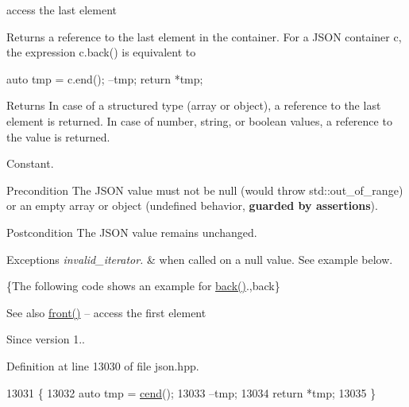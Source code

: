 access the last element 

Returns a reference to the last element in the container. For a J\+S\+ON container {\ttfamily c}, the expression {\ttfamily c.\+back()} is equivalent to 
\begin{DoxyCode}
\textcolor{keyword}{auto} tmp = c.end();
--tmp;
\textcolor{keywordflow}{return} *tmp;
\end{DoxyCode}


\begin{DoxyReturn}{Returns}
In case of a structured type (array or object), a reference to the last element is returned. In case of number, string, or boolean values, a reference to the value is returned.
\end{DoxyReturn}
Constant.

\begin{DoxyPrecond}{Precondition}
The J\+S\+ON value must not be {\ttfamily null} (would throw {\ttfamily std\+::out\+\_\+of\+\_\+range}) or an empty array or object (undefined behavior, {\bfseries guarded by assertions}). 
\end{DoxyPrecond}
\begin{DoxyPostcond}{Postcondition}
The J\+S\+ON value remains unchanged.
\end{DoxyPostcond}

\begin{DoxyExceptions}{Exceptions}
{\em invalid\+\_\+iterator.} & when called on a {\ttfamily null} value. See example below.\\
\hline
\end{DoxyExceptions}
\{The following code shows an example for {\ttfamily \hyperlink{classnlohmann_1_1basic__json_a011397134847f36db0ed7d7a93753677}{back()}}.,back\}

\begin{DoxySeeAlso}{See also}
\hyperlink{classnlohmann_1_1basic__json_a3acba9c6ceb7214e565fe08c3ba5b352}{front()} -- access the first element
\end{DoxySeeAlso}
\begin{DoxySince}{Since}
version 1.. 
\end{DoxySince}


Definition at line 13030 of file json.\+hpp.


\begin{DoxyCode}
13031     \{
13032         \textcolor{keyword}{auto} tmp = \hyperlink{classnlohmann_1_1basic__json_a8dba7b7d2f38e6b0c614030aa43983f6}{cend}();
13033         --tmp;
13034         \textcolor{keywordflow}{return} *tmp;
13035     \}
\end{DoxyCode}
\mbox{\label{classnlohmann_1_1basic__json_a0ff28dac23f2bdecee9564d07f51dcdc}} 
